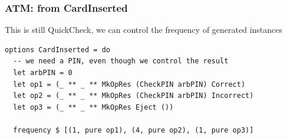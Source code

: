 \documentclass[compress]{beamer}
\begin{document}




\begin{frame}[fragile]
  \frametitle{ATM: from CardInserted}

  \large

  This is still QuickCheck, we can control the frequency of generated instances

  \pause

  \begin{verbatim}
options CardInserted = do
  -- we need a PIN, even though we control the result
  let arbPIN = 0
  let op1 = (_ ** _ ** MkOpRes (CheckPIN arbPIN) Correct)
  let op2 = (_ ** _ ** MkOpRes (CheckPIN arbPIN) Incorrect)
  let op3 = (_ ** _ ** MkOpRes Eject ())

  frequency $ [(1, pure op1), (4, pure op2), (1, pure op3)]
  \end{verbatim}

\end{frame}
\end{document}
